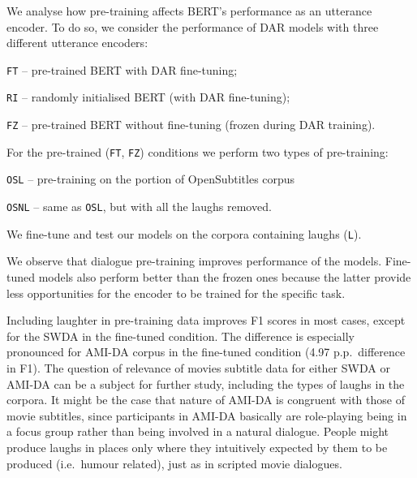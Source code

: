 \documentclass[11pt,a4paper]{article}
\begin{document}
We analyse how pre-training affects BERT's performance as an utterance encoder.
To do so, we consider the performance of DAR models with three different utterance encoders:
\begin{enumerate*}[i)]
\item \texttt{FT} -- pre-trained BERT with DAR fine-tuning;
\item \texttt{RI} -- randomly initialised BERT (with DAR fine-tuning);
\item \texttt{FZ} -- pre-trained BERT without fine-tuning (frozen during DAR training).
\end{enumerate*}
For the pre-trained (\texttt{FT}, \texttt{FZ}) conditions we perform two types of
pre-training:
\begin{enumerate*}[i)]
\item \texttt{OSL} -- pre-training on the portion of OpenSubtitles corpus
\item \texttt{OSNL} -- same as \texttt{OSL}, but with all the laughs removed.
\end{enumerate*}
We fine-tune and test our models on the corpora containing laughs (\texttt{L}).

We observe that dialogue pre-training improves performance of the
models. Fine-tuned models also perform better than the frozen ones
because the latter provide less opportunities for the encoder to be
trained for the specific task.

Including laughter in pre-training data improves F1 scores in most
cases, except for the SWDA in the fine-tuned condition. The difference
is especially pronounced for AMI-DA corpus in the fine-tuned condition
(4.97 p.p.\ difference in F1). The question of relevance of movies
subtitle data for either SWDA or AMI-DA can be a subject for further
study, including the types of laughs in the corpora. It might be the
case that nature of AMI-DA is congruent with those of movie
subtitles, since participants in AMI-DA basically are role-playing being in a 
focus group rather than being involved in a natural
dialogue. People might produce laughs in places only  where
they intuitively expected by them to be produced (i.e.\ humour
related), just as in scripted movie dialogues.
\end{document}
